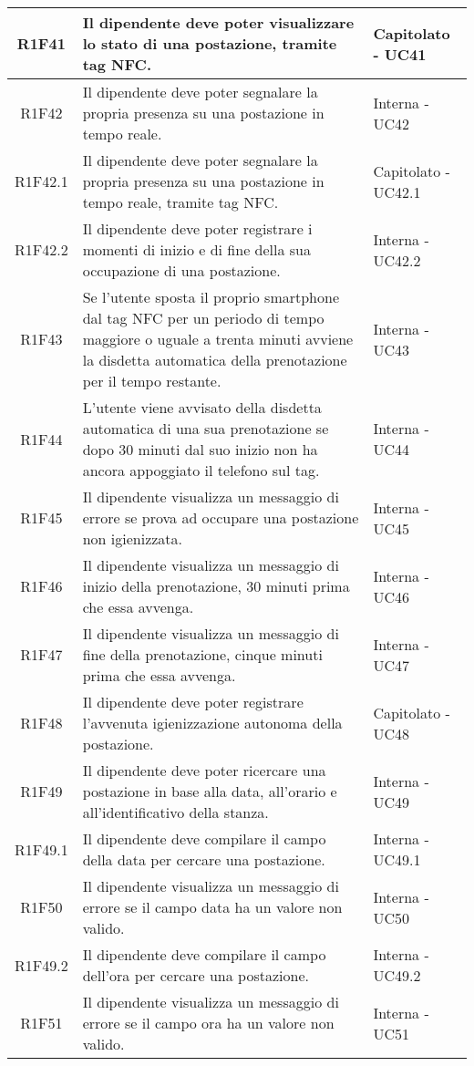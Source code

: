 \begin{center}
\begin{longtable}{|c|p{10cm}|p{4cm}|}
		\hline
		R1F41&Il dipendente deve poter visualizzare lo stato di una postazione, tramite tag NFC.	&Capitolato - UC41 	\\
		\hline
		R1F42 & Il dipendente deve poter segnalare la propria presenza su una postazione in tempo reale. & Interna - UC42 \\
		\hline
		R1F42.1&Il dipendente deve poter segnalare la propria presenza su una postazione in tempo reale, tramite tag NFC.	&Capitolato - UC42.1 	\\
		\hline
		R1F42.2&Il dipendente deve poter registrare i momenti di inizio e di fine della sua occupazione di una postazione.	&Interna - UC42.2 	\\
		\hline
		R1F43&Se l'utente sposta il proprio smartphone dal tag NFC per un periodo di tempo maggiore o uguale a trenta minuti avviene la disdetta automatica della prenotazione per il tempo restante.	&Interna - UC43 	\\
		\hline
		R1F44&L’utente viene avvisato della disdetta automatica di una sua prenotazione se dopo 30 minuti dal suo inizio non ha ancora appoggiato il telefono sul tag.	&Interna - UC44 	\\
		\hline
		R1F45&Il dipendente visualizza un messaggio di errore se prova ad occupare una postazione non igienizzata. &Interna - UC45 	\\
		\hline	
		R1F46&Il dipendente visualizza un messaggio di inizio della prenotazione, 30 minuti prima che essa avvenga.	&Interna - UC46 	\\
		\hline
		R1F47&Il dipendente visualizza un messaggio di fine della prenotazione, cinque minuti prima che essa avvenga.	&Interna - UC47 	\\
		\hline
		R1F48&Il dipendente deve poter registrare l'avvenuta igienizzazione autonoma della postazione.	&Capitolato - UC48	\\
		\hline	
		R1F49&Il dipendente deve poter ricercare una postazione in base alla data, all'orario e all'identificativo della stanza.	&Interna - UC49	\\
		\hline
		R1F49.1&Il dipendente deve compilare il campo della data per cercare una postazione.	&Interna - UC49.1	\\
		\hline
		R1F50&Il dipendente visualizza un messaggio di errore se il campo data ha un valore non valido.	&Interna - UC50	\\
		\hline
		R1F49.2&Il dipendente deve compilare il campo dell'ora per cercare una postazione.	&Interna - UC49.2	\\
		\hline
		R1F51&Il dipendente visualizza un messaggio di errore se il campo ora ha un valore non valido.	&Interna - UC51	\\

\end{longtable}
\end{center}
